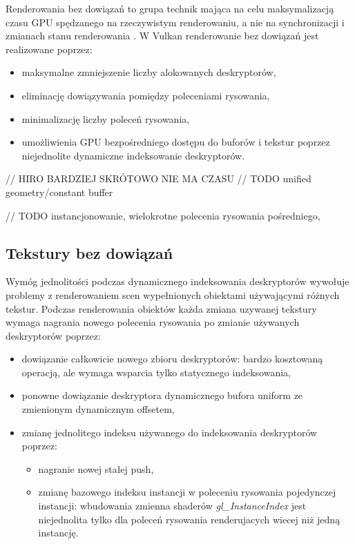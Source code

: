 Renderowania bez dowiązań to grupa technik mająca na celu maksymalizacją czasu GPU spędzanego na rzeczywistym renderowaniu, a nie na synchronizacji i zmianach stanu renderowania \cite{kosarevsky20213d}.
W Vulkan renderowanie bez dowiązań jest realizowane poprzez:
\begin{itemize}
	\item maksymalne zmniejszenie liczby alokowanych deskryptorów,
	\item eliminację dowiązywania pomiędzy poleceniami rysowania,
	\item minimalizację liczby poleceń rysowania,
	\item umożliwienia GPU bezpośredniego dostępu do buforów i tekstur poprzez niejednolite dynamiczne indeksowanie deskryptorów.
\end{itemize}

// HIRO BARDZIEJ SKRÓTOWO NIE MA CZASU
// TODO unified geometry/constant buffer

// TODO instancjonowanie, wielokrotne polecenia rysowania pośredniego,

\subsection {Tekstury bez dowiązań}

Wymóg jednolitości podczas dynamicznego indeksowania deskryptorów wywołuje problemy z renderowaniem scen wypełnionych obiektami używającymi różnych tekstur.
Podczas renderowania obiektów każda zmiana uzywanej tekstury wymaga nagrania nowego polecenia rysowania po zmianie używanych deskryptorów poprzez:
\begin{itemize}
	\item dowiązanie całkowicie nowego zbioru deskryptorów: bardzo kosztowaną operacją, ale wymaga wsparcia tylko statycznego indeksowania,
	\item ponowne dowiązanie deskryptora dynamicznego bufora uniform ze zmienionym dynamicznym offsetem,
	\item zmianę jednolitego indeksu używanego do indeksowania deskryptorów poprzez:
	\begin{itemize}
		\item nagranie nowej stałej push,
		\item zmianę bazowego indeksu instancji w poleceniu rysowania pojedynczej instancji: wbudowania zmienna shaderów \textit{gl\_InstanceIndex} jest niejednolita tylko dla poleceń rysowania renderujacych wiecej niż jedną instancję.
	\end{itemize}
\end{itemize}

